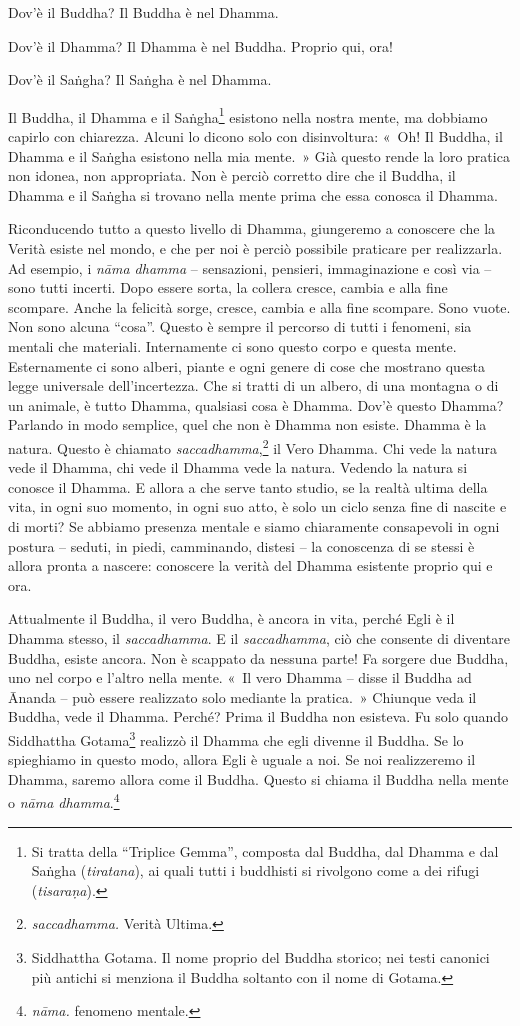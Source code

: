 Dov'è il Buddha? Il Buddha è nel Dhamma.

Dov'è il Dhamma? Il Dhamma è nel Buddha. Proprio qui, ora!

Dov'è il Saṅgha? Il Saṅgha è nel Dhamma.

Il Buddha, il Dhamma e il Saṅgha\footnote{Si tratta della ``Triplice
  Gemma'', composta dal Buddha, dal Dhamma e dal Saṅgha
  (\emph{tiratana}), ai quali tutti i buddhisti si rivolgono come a dei
  rifugi (\emph{tisaraṇa}).} esistono nella nostra mente, ma dobbiamo
capirlo con chiarezza. Alcuni lo dicono solo con disinvoltura: «~Oh! Il
Buddha, il Dhamma e il Saṅgha esistono nella mia mente.~» Già questo
rende la loro pratica non idonea, non appropriata. Non è perciò corretto
dire che il Buddha, il Dhamma e il Saṅgha si trovano nella mente prima
che essa conosca il Dhamma.

Riconducendo tutto a questo livello di Dhamma, giungeremo a conoscere
che la Verità esiste nel mondo, e che per noi è perciò possibile
praticare per realizzarla. Ad esempio, i \emph{nāma dhamma} --
sensazioni, pensieri, immaginazione e così via -- sono tutti incerti.
Dopo essere sorta, la collera cresce, cambia e alla fine scompare. Anche
la felicità sorge, cresce, cambia e alla fine scompare. Sono vuote. Non
sono alcuna ``cosa''. Questo è sempre il percorso di tutti i fenomeni,
sia mentali che materiali. Internamente ci sono questo corpo e questa
mente. Esternamente ci sono alberi, piante e ogni genere di cose che
mostrano questa legge universale dell'incertezza. Che si tratti di un
albero, di una montagna o di un animale, è tutto Dhamma, qualsiasi cosa
è Dhamma. Dov'è questo Dhamma? Parlando in modo semplice, quel che non è
Dhamma non esiste. Dhamma è la natura. Questo è chiamato
\emph{saccadhamma},\footnote{\emph{saccadhamma.} Verità Ultima.}
il Vero Dhamma. Chi vede la natura vede il Dhamma, chi
vede il Dhamma vede la natura. Vedendo la natura si conosce il Dhamma. E
allora a che serve tanto studio, se la realtà ultima della vita, in ogni
suo momento, in ogni suo atto, è solo un ciclo senza fine di nascite e
di morti? Se abbiamo presenza mentale e siamo chiaramente consapevoli in
ogni postura -- seduti, in piedi, camminando, distesi -- la conoscenza
di se stessi è allora pronta a nascere: conoscere la verità del Dhamma
esistente proprio qui e ora.

Attualmente il Buddha, il vero Buddha, è ancora in vita, perché Egli è
il Dhamma stesso, il \emph{saccadhamma}. E il \emph{saccadhamma}, ciò
che consente di diventare Buddha, esiste ancora. Non è scappato da
nessuna parte! Fa sorgere due Buddha, uno nel corpo e l'altro nella
mente. «~Il vero Dhamma -- disse il Buddha ad Ānanda -- può essere
realizzato solo mediante la pratica.~» Chiunque veda il Buddha, vede il
Dhamma. Perché? Prima il Buddha non esisteva. Fu solo quando Siddhattha
Gotama\footnote{Siddhattha Gotama. Il nome proprio del Buddha storico;
  nei testi canonici più antichi si menziona il Buddha soltanto con il
  nome di Gotama.} realizzò il Dhamma che egli divenne il Buddha. Se lo
spieghiamo in questo modo, allora Egli è uguale a noi. Se noi
realizzeremo il Dhamma, saremo allora come il Buddha. Questo si chiama
il Buddha nella mente o \emph{nāma dhamma}.\footnote{\emph{nāma.}
  fenomeno mentale.}

